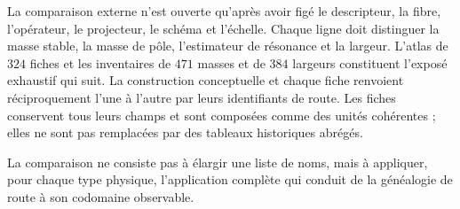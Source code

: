 La comparaison externe n'est ouverte qu'après avoir figé le descripteur,
la fibre, l'opérateur, le projecteur, le schéma et l'échelle. Chaque ligne doit distinguer la masse
stable, la masse de pôle, l'estimateur de résonance et la largeur. L'atlas de \(324\)
fiches et les inventaires de \(471\) masses et de \(384\) largeurs constituent
l'exposé exhaustif qui suit. La construction conceptuelle et chaque fiche
renvoient réciproquement l'une à l'autre par leurs identifiants de route. Les fiches
conservent tous leurs champs et sont composées comme des unités cohérentes ; elles ne sont pas
remplacées par des tableaux historiques abrégés.

La comparaison ne consiste pas à élargir une liste de noms, mais à appliquer,
pour chaque type physique, l'application complète qui conduit de la généalogie de route
à son codomaine observable.
